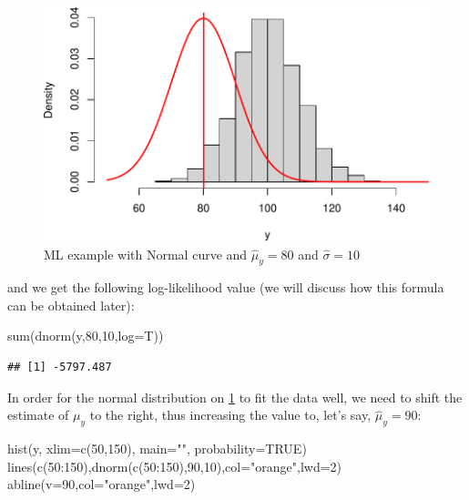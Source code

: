 \documentclass[
]{book}
\newenvironment{Shaded}{\begin{snugshade}}{\end{snugshade}}
\newcommand{\AttributeTok}[1]{\textcolor[rgb]{0.77,0.63,0.00}{#1}}
\newcommand{\ConstantTok}[1]{\textcolor[rgb]{0.00,0.00,0.00}{#1}}
\newcommand{\DecValTok}[1]{\textcolor[rgb]{0.00,0.00,0.81}{#1}}
\newcommand{\FunctionTok}[1]{\textcolor[rgb]{0.00,0.00,0.00}{#1}}
\newcommand{\NormalTok}[1]{#1}
\newcommand{\SpecialCharTok}[1]{\textcolor[rgb]{0.00,0.00,0.00}{#1}}
\newcommand{\StringTok}[1]{\textcolor[rgb]{0.31,0.60,0.02}{#1}}
\theoremstyle{definition}
\theoremstyle{definition}
\theoremstyle{definition}
\theoremstyle{definition}
\theoremstyle{remark}
\begin{document}
\begin{figure}
\centering
\includegraphics{Svetunkov---Statistics-for-Business-Analytics_files/figure-latex/MLENormalExample01-1.pdf}
\caption{\label{fig:MLENormalExample01}ML example with Normal curve and \(\hat{\mu}_y=80\) and \(\hat{\sigma}=10\)}
\end{figure}

and we get the following log-likelihood value (we will discuss how this formula can be obtained later):

\begin{Shaded}
\begin{Highlighting}[]
\FunctionTok{sum}\NormalTok{(}\FunctionTok{dnorm}\NormalTok{(y,}\DecValTok{80}\NormalTok{,}\DecValTok{10}\NormalTok{,}\AttributeTok{log=}\NormalTok{T))}
\end{Highlighting}
\end{Shaded}

\begin{verbatim}
## [1] -5797.487
\end{verbatim}

In order for the normal distribution on \ref{fig:MLENormalExample01} to fit the data well, we need to shift the estimate of \(\mu_y\) to the right, thus increasing the value to, let's say, \(\hat{\mu}_y=90\):

\begin{Shaded}
\begin{Highlighting}[]
\FunctionTok{hist}\NormalTok{(y, }\AttributeTok{xlim=}\FunctionTok{c}\NormalTok{(}\DecValTok{50}\NormalTok{,}\DecValTok{150}\NormalTok{), }\AttributeTok{main=}\StringTok{""}\NormalTok{, }\AttributeTok{probability=}\ConstantTok{TRUE}\NormalTok{)}
\FunctionTok{lines}\NormalTok{(}\FunctionTok{c}\NormalTok{(}\DecValTok{50}\SpecialCharTok{:}\DecValTok{150}\NormalTok{),}\FunctionTok{dnorm}\NormalTok{(}\FunctionTok{c}\NormalTok{(}\DecValTok{50}\SpecialCharTok{:}\DecValTok{150}\NormalTok{),}\DecValTok{90}\NormalTok{,}\DecValTok{10}\NormalTok{),}\AttributeTok{col=}\StringTok{"orange"}\NormalTok{,}\AttributeTok{lwd=}\DecValTok{2}\NormalTok{)}
\FunctionTok{abline}\NormalTok{(}\AttributeTok{v=}\DecValTok{90}\NormalTok{,}\AttributeTok{col=}\StringTok{"orange"}\NormalTok{,}\AttributeTok{lwd=}\DecValTok{2}\NormalTok{)}
\end{Highlighting}
\end{Shaded}
\end{document}
